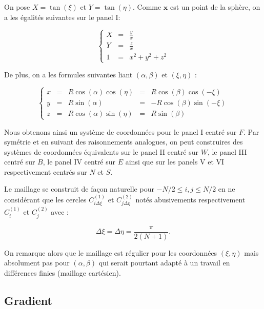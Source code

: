 On pose $X = \tan ( \xi )$ et $Y = \tan ( \eta )$. Comme $\mathbf{x}$ est un point de la sphère, on a les égalités suivantes sur le panel I:

\begin{equation}
\left\{
\begin{array}{rcl}
  X &=& \frac{y}{x} \\
  Y &=& \frac{z}{x} \\
  1 &=& x^2 + y^2 + z^2
\end{array}
\right.
\label{coordgno}
\end{equation}

De plus, on a les formules suivantes liant $( \alpha, \beta)$ et $( \xi, \eta )$ :

\begin{equation}
\left\{
\begin{array}{rcccl}
  x &=& R \cos ( \alpha ) \cos ( \eta ) &=& R \cos ( \beta ) \cos ( - \xi ) \\
  y &=& R \sin ( \alpha ) &=& - R \cos ( \beta ) \sin ( - \xi ) \\
  z &=& R \cos ( \alpha ) \sin ( \eta ) &=& R \sin ( \beta )
\end{array}
\right.
\label{coord}
\end{equation}

Nous obtenons ainsi un système de coordonnées pour le panel I centré sur $F$. Par symétrie et en suivant des raisonnements analogues, on peut construires des systèmes de coordonnées équivalents sur le panel II centré sur $W$, le panel III centré sur $B$, le panel IV centré sur $E$ ainsi que sur les panels V et VI respectivement centrés sur $N$ et $S$.

Le maillage se construit de façon naturelle pour $-N/2 \leq i,j \leq N/2$ en ne considérant que les cercles $C^{(1)}_{i \Delta \xi}$ et $C^{(2)}_{j \Delta \eta}$ notés abusivements respectivement $C^{(1)}_i$ et $C^{(2)}_j$ avec :

\begin{equation}
\Delta \xi = \Delta \eta = \dfrac{\pi}{2 ( N+1 )}. 
\end{equation}

On remarque alors que le maillage est régulier pour les coordonnées $(\xi, \eta)$ mais absolument pas pour $(\alpha, \beta)$ qui serait pourtant adapté à un travail en différences finies (maillage cartésien).

\subsection{Gradient}

